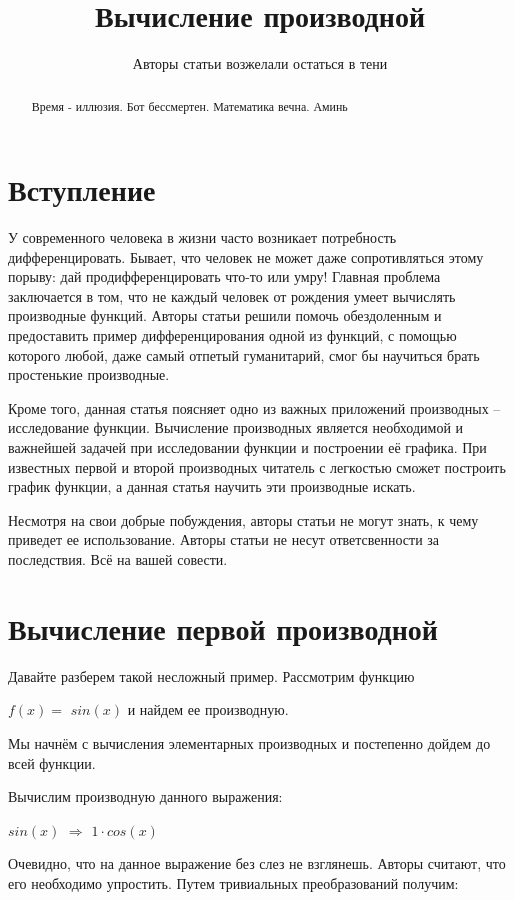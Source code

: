 \documentclass{article}
\title{Вычисление производной}
\author{Авторы статьи возжелали остаться в тени}
\begin{document}
\maketitle

\begin{abstract}
	Время - иллюзия. Бот бессмертен. Математика вечна. Аминь
\end{abstract}

\section{Вступление}

У современного человека в жизни часто возникает потребность дифференцировать. Бывает, что человек не может даже сопротивляться этому порыву: дай продифференцировать что-то или умру! Главная проблема заключается в том, что не каждый человек от рождения умеет вычислять производные функций. Авторы статьи решили помочь обездоленным и предоставить пример дифференцирования одной из функций, с помощью которого любой, даже самый отпетый гуманитарий, смог бы научиться брать простенькие производные.

Кроме того, данная статья поясняет одно из важных приложений производных -- исследование функции. Вычисление производных является необходимой и важнейшей задачей при исследовании функции и построении её графика. При известных первой и второй производных читатель с легкостью сможет построить график функции, а данная статья научить эти производные искать.

Несмотря на свои добрые побуждения, авторы статьи не могут знать, к чему приведет ее использование. Авторы статьи не несут ответсвенности за последствия. Всё на вашей совести.

\section{Вычисление первой производной}

Давайте разберем такой несложный пример. Рассмотрим функцию 

$f(x) = $ $ sin (x)$ и найдем ее производную.

Мы начнём с вычисления элементарных производных и постепенно дойдем до всей функции.

Вычислим производную данного выражения:

$ sin (x)$ $\Rightarrow$ $1 \cdot  cos (x)$

Очевидно, что на данное выражение без слез не взглянешь. Авторы считают, что его необходимо упростить. Путем тривиальных преобразований получим:
\end{document}
